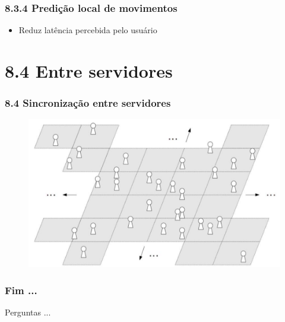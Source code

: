 \documentclass{beamer}
\begin{document}
\begin{frame}
  \frametitle{8.3.4 Predição local de movimentos}
  \begin{itemize}
    \item Reduz latência percebida pelo usuário
  \end{itemize}
\end{frame}

\section{8.4 Entre servidores}

\begin{frame}
  \frametitle{8.4 Sincronização entre servidores}
  \begin{figure}[h]
    \centering
    \vspace{-18pt}
    \includegraphics[width=1.03\textwidth]{imagem_84.png}
    \vspace{-20pt}
  \end{figure}
\end{frame}

\begin{frame}
  \frametitle{Fim ...}
  Perguntas ...
\end{frame}
\end{document}
